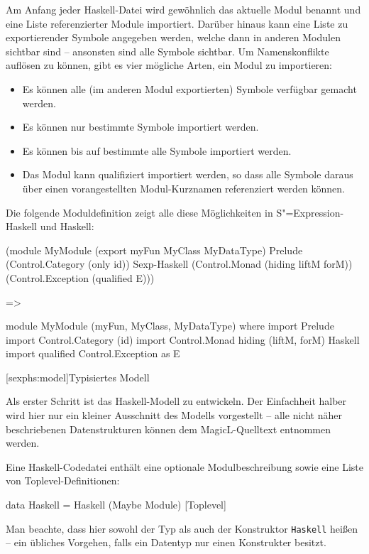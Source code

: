 \documentclass[11pt, a4paper, bibgerm]{scrbook}
\newenvironment{DIFnomarkup}{}{}
\newcommand\icode[1]{\lstinline?#1?}
\newcommand\lsection{}
\newcommand{\sexp}{S"=Expression}
\begin{document}
Am Anfang jeder Haskell-Datei wird gewöhnlich das aktuelle Modul
benannt und eine Liste referenzierter Module importiert. Darüber
hinaus kann eine Liste zu exportierender Symbole angegeben werden,
welche dann in anderen Modulen sichtbar sind -- ansonsten sind alle
Symbole sichtbar. Um Namenskonflikte auflösen zu können, gibt es vier
mögliche Arten, ein Modul zu importieren:
\begin{itemize}
\item Es können alle (im anderen Modul exportierten) Symbole verfügbar gemacht
  werden.
\item Es können nur bestimmte Symbole importiert werden.
\item Es können bis auf bestimmte alle Symbole importiert werden.
\item Das Modul kann qualifiziert importiert werden, so dass alle
  Symbole daraus über einen vorangestellten Modul-Kurznamen
  referenziert werden können.
\end{itemize}
Die folgende Moduldefinition zeigt alle diese Möglichkeiten in
\sexp{}-Haskell und Haskell:
\begin{DIFnomarkup}\begin{code}
(module MyModule
  (export myFun MyClass MyDataType)
  Prelude
  (Control.Category (only id))                       Sexp-Haskell
  (Control.Monad (hiding liftM forM))
  (Control.Exception (qualified E)))

=>

module MyModule (myFun, MyClass, MyDataType) where
import Prelude
import Control.Category (id)
import Control.Monad hiding (liftM, forM)            Haskell
import qualified Control.Exception as E
\end{code}\end{DIFnomarkup}


\lsection[sexphs:model]{Typisiertes Modell}

Als erster Schritt ist das Haskell-Modell zu entwickeln. Der Einfachheit
halber wird hier nur ein kleiner Ausschnitt des Modells vorgestellt --
alle nicht näher beschriebenen Datenstrukturen können dem
MagicL-Quelltext entnommen werden.

Eine Haskell-Codedatei enthält eine optionale Modulbeschreibung sowie
eine Liste von Toplevel-Definitionen:
\begin{DIFnomarkup}\begin{code}
data Haskell = Haskell (Maybe Module) [Toplevel]
\end{code}\end{DIFnomarkup}
Man beachte, dass hier sowohl der Typ als auch der Konstruktor
\icode{Haskell} heißen -- ein übliches Vorgehen, falls ein Datentyp nur
einen Konstrukter besitzt.
\end{document}
